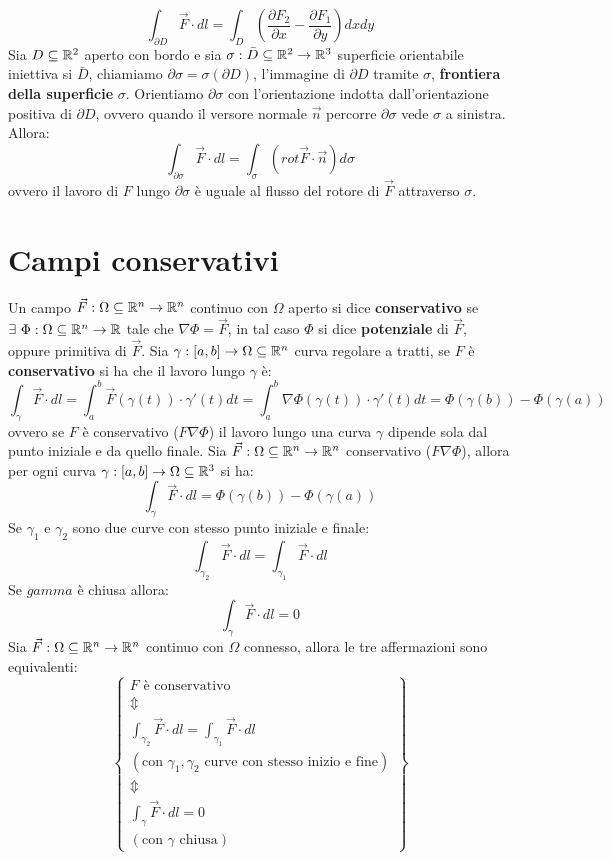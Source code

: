 	$$\int_{\partial D} \vec F \cdot dl = \int_D \left(\frac{\partial F_2}{\partial x}-\frac{\partial F_1}{\partial y}\right)dxdy$$
	Sia $D \subseteq \mathbb{R}^2$ aperto con bordo e sia $\sigma : \bar D \subseteq \mathbb{R}^2 \rightarrow \mathbb{R}^3$ superficie orientabile iniettiva si $\bar D$, chiamiamo $\partial \sigma = \sigma (\partial D)$, l'immagine di $\partial D$ tramite $\sigma$, \textbf{frontiera della superficie} $\sigma$. Orientiamo $\partial \sigma$ con l'orientazione indotta dall'orientazione positiva di $\partial D$, ovvero quando il versore normale $\vec n$ percorre $\partial \sigma$ vede $\sigma$ a sinistra. Allora:
	$$\int_{\partial\sigma} \vec F \cdot dl = \int_\sigma \left(rot \vec F \cdot \vec n\right)d\sigma$$
	ovvero il lavoro di $F$ lungo $\partial \sigma$ è uguale al flusso del rotore di $\vec F$ attraverso $\sigma$.
	\section{Campi conservativi}
	Un campo $\vec F: \Omega \subseteq \mathbb{R}^n \rightarrow \mathbb{R}^n$ continuo con $\Omega$ aperto si dice \textbf{conservativo} se $\exists \ \Phi : \Omega \subseteq \mathbb{R}^n \rightarrow \mathbb{R}$ tale che $\nabla \Phi = \vec F$, in tal caso $\Phi$ si dice \textbf{potenziale} di $\vec F$, oppure primitiva di $\vec F$.
	\prop
	Sia $\gamma:[a,b]\rightarrow \Omega \subseteq \mathbb{R}^n$ curva regolare a tratti, se $F$ è \textbf{conservativo} si ha che il lavoro lungo $\gamma$ è:
	$$\int_\gamma \vec F \cdot dl = \int_a^b \vec F(\gamma (t))\cdot \gamma'(t)dt=\int_{a}^{b} \nabla \Phi (\gamma(t))\cdot \gamma'(t)dt=\Phi(\gamma(b))-\Phi(\gamma(a))$$
	ovvero se $F$ è conservativo ($F\nabla \Phi$) il lavoro lungo una curva $\gamma$ dipende sola dal punto iniziale e da quello finale.
	\thh
	Sia $\vec F: \Omega \subseteq \mathbb{R}^n \rightarrow \mathbb{R}^n$ conservativo ($F\nabla \Phi$), allora per ogni curva $\gamma:[a,b]\rightarrow \Omega \subseteq \mathbb{R}^3$ si ha:
	$$\int_\gamma \vec F \cdot dl =\Phi(\gamma(b))-\Phi(\gamma(a))$$
	Se $\gamma_1$ e $\gamma_2$ sono due curve con stesso punto iniziale e finale:
	$$\int_{\gamma_2} \vec F \cdot dl = \int_{\gamma_1} \vec F \cdot dl$$
	Se $gamma$ è chiusa allora:
	$$\int_\gamma \vec F \cdot dl =0$$
	\thh
	Sia $\vec F: \Omega \subseteq \mathbb{R}^n \rightarrow \mathbb{R}^n$ continuo con $\Omega$ connesso, allora le tre affermazioni sono equivalenti:
	$$\begin{Bmatrix}
		F \text{ è conservativo}\\
		  \Updownarrow\\
		 \int_{\gamma_2} \vec F \cdot dl = \int_{\gamma_1} \vec F \cdot dl\\
		 (\text{con } \gamma_1,\gamma_2 \text{ curve con stesso inizio e fine})\\
		 \Updownarrow\\
		 \int_\gamma \vec F \cdot dl =0\\
		 (\text{con } \gamma \text{ chiusa})
	\end{Bmatrix}$$
